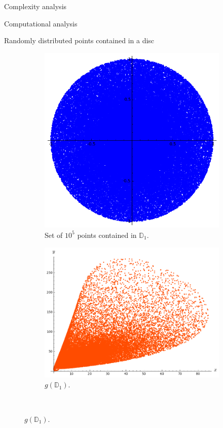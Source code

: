 \documentclass[11pt, a4paper, english, twoside, notitlepage, openright]{report}
\begin{document}
\begin{chapter}{Complexity analysis}
\begin{section}{Computational analysis}
\begin{subsection}{Randomly distributed points contained in a disc}
\begin{figure}[ht!]
\vspace{-0.6cm}
\hspace{0.1cm}
\begin{subfigure}{.45\linewidth}\centering
\includegraphics[width=1\textwidth]{plots/ch5_34_disc.png}
\vspace{-0.4cm}\caption{Set of $10^5$ points contained in ${\mathbb D}_1$.\label{fig:discs}}
\end{subfigure}
\begin{subfigure}{.49\linewidth}\centering
\includegraphics[width=1\textwidth]{plots/ch5_35_disc1.png}
\vspace{-0.4cm}\caption{$g({\mathbb D}_1)$.\label{fig:disc1}}
\end{subfigure}\\[1ex]
\vspace{-0.2cm}


\end{figure}
\end{subsection}
\end{section}
\end{chapter}
\end{document}
